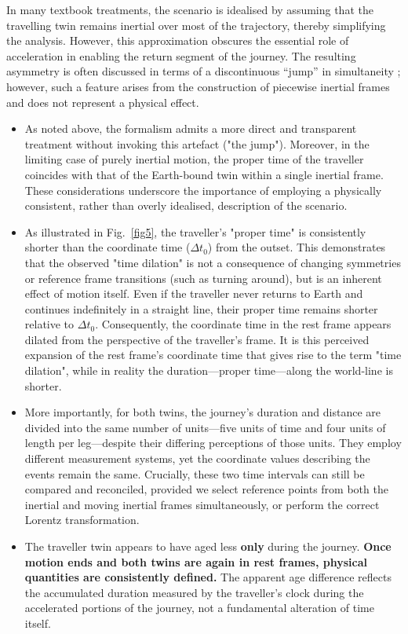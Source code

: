 \documentclass[pdflatex,sn-basic]{sn-jnl}
\theoremstyle{thmstyleone}%
\theoremstyle{thmstyletwo}%
\theoremstyle{thmstylethree}%
\begin{document}
	In many textbook treatments, the scenario is idealised by assuming that the travelling twin remains inertial over most of the trajectory, thereby simplifying the analysis. However, this approximation obscures the essential role of acceleration in enabling the return segment of the journey. The resulting asymmetry is often discussed in terms of a discontinuous “jump” in simultaneity \cite{rindler2006}; however, such a feature arises from the construction of piecewise inertial frames and does not represent a physical effect.
		\begin{itemize}
			\item As noted above, the formalism admits a more direct and transparent treatment without invoking this artefact ("the jump"). Moreover, in the limiting case of purely inertial motion, the proper time of the traveller coincides with that of the Earth-bound twin within a single inertial frame. These considerations underscore the importance of employing a physically consistent, rather than overly idealised, description of the scenario.
			\item As illustrated in Fig.~\ref{fig5}, the traveller's "proper time" is consistently shorter than the coordinate time ($\Delta t_0$) from the outset. This demonstrates that the observed "time dilation" is not a consequence of changing symmetries or reference frame transitions (such as turning around), but is an inherent effect of motion itself. Even if the traveller never returns to Earth and continues indefinitely in a straight line, their proper time remains shorter relative to $\Delta t_0$.
	Consequently, the coordinate time in the rest frame appears dilated from the perspective of the traveller's frame. It is this perceived expansion of the rest frame's coordinate time that gives rise to the term "time dilation", while in reality the duration—proper time—along the world-line is shorter. 
			\item More importantly, for both twins, the journey's duration and distance are divided into the same number of units—five units of time and four units of length per leg—despite their differing perceptions of those units. They employ different measurement systems, yet the coordinate values describing the events remain the same. Crucially, these two time intervals can still be compared and reconciled, provided we select reference points from both the inertial and moving inertial frames simultaneously, or perform the correct Lorentz transformation.
 			\item The traveller twin appears to have aged less \textbf{only} during the journey. \textbf{Once motion ends and both twins are again in rest frames, physical quantities are consistently defined.} The apparent age difference reflects the accumulated duration measured by the traveller's clock during the accelerated portions of the journey, not a fundamental alteration of time itself.

\end{itemize}
\end{document}

